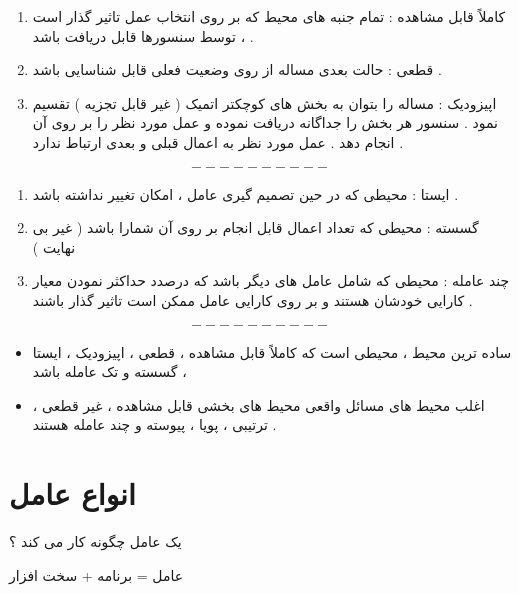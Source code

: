 \documentclass[12pt]{article}
\begin{document}
\begin{enumerate}
	\item کاملاً قابل مشاهده
	 :
	تمام جنبه های محیط که بر روی انتخاب عمل تاثیر گذار است ، توسط سنسورها قابل دریافت باشد .
	\item قطعی
	 :
	حالت بعدی مساله از روی وضعیت فعلی قابل شناسایی باشد .
	\item اپیزودیک
	 :
	مساله را بتوان به بخش های کوچکتر اتمیک ( غیر قابل تجزیه ) تقسیم نمود . سنسور هر بخش را جداگانه دریافت نموده و عمل مورد نظر را بر روی آن انجام دهد . عمل مورد نظر به اعمال قبلی و بعدی ارتباط ندارد .
\end{enumerate}


$$
----------
$$

\vspace{10pt}

\begin{enumerate}
	\item ایستا
	 :
	محیطی که در حین تصمیم گیری عامل ، امکان تغییر نداشته باشد .
	\item  گسسته
	 :
	محیطی که تعداد اعمال قابل انجام بر روی آن شمارا باشد ( غیر بی نهایت )
	\item چند عامله
	 :
	محیطی که شامل عامل های دیگر باشد که درصدد حداکثر نمودن معیار کارایی خودشان هستند و بر روی کارایی عامل ممکن است تاثیر گذار باشند .
\end{enumerate}


$$
----------
$$

\vspace{10pt}


\begin{itemize}
	\item ساده ترین محیط ، محیطی است که کاملاً قابل مشاهده ، قطعی ، اپیزودیک ، ایستا ، گسسته و تک عامله باشد
	\item اغلب محیط های مسائل واقعی محیط های بخشی قابل مشاهده ، غیر قطعی ، ترتیبی ، پویا ، پیوسته و چند عامله هستند .
\end{itemize}






\section{انواع عامل}

\noindent
یک عامل چگونه کار می کند ؟

\begin{center}
عامل = برنامه + سخت افزار
\end{center}
\end{document}

